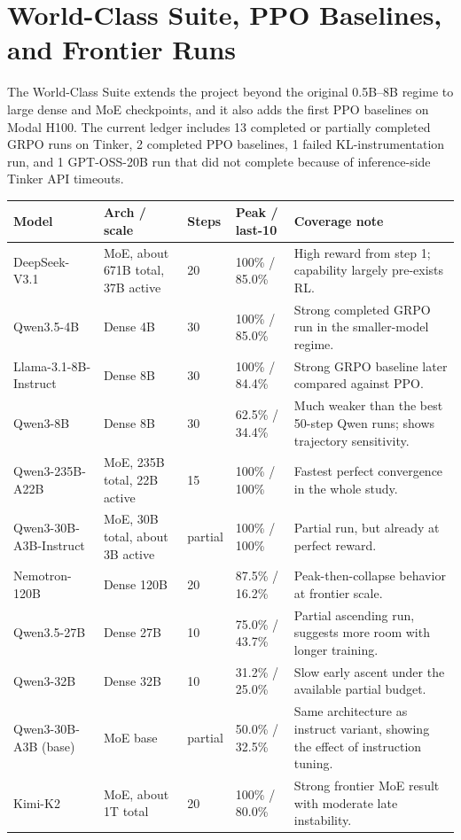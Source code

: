 \section*{World-Class Suite, PPO Baselines, and Frontier Runs}

The World-Class Suite extends the project beyond the original 0.5B--8B regime
to large dense and MoE checkpoints, and it also adds the first PPO baselines on
Modal H100. The current ledger includes 13 completed or partially completed GRPO
runs on Tinker, 2 completed PPO baselines, 1 failed KL-instrumentation run, and
1 GPT-OSS-20B run that did not complete because of inference-side Tinker API
timeouts.

\small
\begin{center}
\begin{tabularx}{\textwidth}{L{2.8cm}L{1.5cm}L{1.1cm}L{1.3cm}Y}
\toprule
Model & Arch / scale & Steps & Peak / last-10 & Coverage note \\
\midrule
DeepSeek-V3.1 & MoE, about 671B total, 37B active & 20 & 100\% / 85.0\% & High reward from step 1; capability largely pre-exists RL. \\
Qwen3.5-4B & Dense 4B & 30 & 100\% / 85.0\% & Strong completed GRPO run in the smaller-model regime. \\
Llama-3.1-8B-Instruct & Dense 8B & 30 & 100\% / 84.4\% & Strong GRPO baseline later compared against PPO. \\
Qwen3-8B & Dense 8B & 30 & 62.5\% / 34.4\% & Much weaker than the best 50-step Qwen runs; shows trajectory sensitivity. \\
Qwen3-235B-A22B & MoE, 235B total, 22B active & 15 & 100\% / 100\% & Fastest perfect convergence in the whole study. \\
Qwen3-30B-A3B-Instruct & MoE, 30B total, about 3B active & partial & 100\% / 100\% & Partial run, but already at perfect reward. \\
Nemotron-120B & Dense 120B & 20 & 87.5\% / 16.2\% & Peak-then-collapse behavior at frontier scale. \\
Qwen3.5-27B & Dense 27B & 10 & 75.0\% / 43.7\% & Partial ascending run, suggests more room with longer training. \\
Qwen3-32B & Dense 32B & 10 & 31.2\% / 25.0\% & Slow early ascent under the available partial budget. \\
Qwen3-30B-A3B (base) & MoE base & partial & 50.0\% / 32.5\% & Same architecture as instruct variant, showing the effect of instruction tuning. \\
Kimi-K2 & MoE, about 1T total & 20 & 100\% / 80.0\% & Strong frontier MoE result with moderate late instability. \\
\bottomrule
\end{tabularx}
\end{center}
\normalsize

